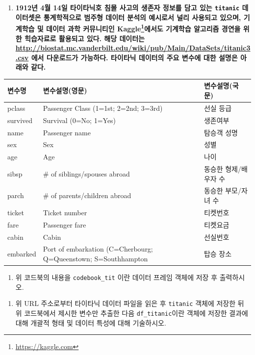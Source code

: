\documentclass[
  11pt,
]{krantz}
\providecommand{\tightlist}{%
  \setlength{\itemsep}{0pt}\setlength{\parskip}{0pt}}
\renewcommand{\href}[2]{#2\footnote{\url{#1}}}
\begin{document}
\begin{enumerate}
\def\labelenumi{\arabic{enumi}.}
\setcounter{enumi}{2}
\tightlist
\item
  \textbf{1912년 4월 14일 타이타닉호 침몰 사고의 생존자 정보를 담고 있는 \texttt{titanic} 데이터셋은 통계학적으로 범주형 데이터 분석의 예시로서 널리 사용되고 있으며, 기계학습 및 데이터 과학 커뮤니티인 \href{https://kaggle.com}{Kaggle}에서도 기계학습 알고리즘 경연을 위한 힉습자료로 활용되고 있다. 해당 데이터는 \url{http://biostat.mc.vanderbilt.edu/wiki/pub/Main/DataSets/titanic3.csv} 에서 다운로드가 가능하다. 타이타닉 데이터의 주요 변수에 대한 설명은 아래와 같다.}
\end{enumerate}

\footnotesize

\begin{tabular}{l|l|l}
\hline
변수명 & 변수설명(영문) & 변수설명(국문)\\
\hline
pclass & Passenger Class (1=1st; 2=2nd; 3=3rd) & 선실 등급\\
\hline
survived & Survival (0=No; 1=Yes) & 생존여부\\
\hline
name & Passenger name & 탐승객 성명\\
\hline
sex & Sex & 성별\\
\hline
age & Age & 나이\\
\hline
sibsp & \# of siblings/spouses abroad & 동승한 형제/배우자 수\\
\hline
parch & \# of parents/children abroad & 동승한 부모/자녀 수\\
\hline
ticket & Ticket number & 티켓번호\\
\hline
fare & Passenger fare & 티켓요금\\
\hline
cabin & Cabin & 선실번호\\
\hline
embarked & Port of embarkation (C=Cherbourg; Q=Queenstown; S=Southhampton & 탑승 장소\\
\hline
\end{tabular}

\normalsize

\begin{enumerate}
\def\labelenumi{\alph{enumi})}
\tightlist
\item
  위 코드북의 내용을 \texttt{codebook\_tit} 이란 데이터 프레임 객체에 저장 후 출력하시오.
\end{enumerate}

\begin{enumerate}
\def\labelenumi{\alph{enumi})}
\setcounter{enumi}{1}
\tightlist
\item
  위 URL 주소로부터 타이타닉 데이터 파일을 읽은 후 \texttt{titanic} 객체에 저장한 뒤 위 코드북에서 제시한 변수만 추출한 다음 \texttt{df\_titanic}이란 객체에 저장한 결과에 대해 개괄적 형태 및 데이터 특성에 대해 기술하시오.
\end{enumerate}
\end{document}
